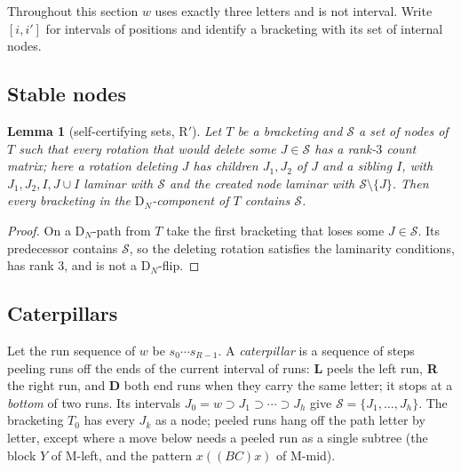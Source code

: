 \documentclass[11pt,a4paper]{article}
\newtheorem{lemma}[thm]{Lemma}
\theoremstyle{definition}
\theoremstyle{remark}
\newcommand{\DN}{\mathrm{D}_N}
\newcommand{\cS}{\mathcal{S}}
\begin{document}
Throughout this section $w$ uses exactly three letters and is not interval. Write $[i,i']$ for
intervals of positions and identify a bracketing with its set of internal nodes.

\subsection{Stable nodes}

\begin{lemma}[self-certifying sets, R$'$]\label{lem:Rprime}
Let $T$ be a bracketing and $\cS$ a set of nodes of $T$ such that every rotation that would delete some
$J\in\cS$ has a rank-$3$ count matrix; here a rotation deleting $J$ has children $J_1,J_2$ of $J$ and a
sibling $I$, with $J_1,J_2,I,J\cup I$ laminar with $\cS$ and the created node laminar with
$\cS\setminus\{J\}$. Then every bracketing in the $\DN$-component of $T$ contains $\cS$.
\end{lemma}
\begin{proof}
On a $\DN$-path from $T$ take the first bracketing that loses some $J\in\cS$. Its predecessor contains
$\cS$, so the deleting rotation satisfies the laminarity conditions, has rank $3$, and is not a
$\DN$-flip.
\end{proof}

\subsection{Caterpillars}

Let the run sequence of $w$ be $s_0\cdots s_{R-1}$. A \emph{caterpillar} is a sequence of steps peeling
runs off the ends of the current interval of runs: \textbf{L} peels the left run, \textbf{R} the right
run, and \textbf{D} both end runs when they carry the same letter; it stops at a \emph{bottom} of two
runs. Its intervals $J_0=w\supset J_1\supset\cdots\supset J_h$ give $\cS=\{J_1,\dots,J_h\}$. The
bracketing $T_0$ has every $J_k$ as a node; peeled runs hang off the path letter by letter, except where
a move below needs a peeled run as a single subtree (the block $Y$ of M-left, and the pattern $x((BC)x)$
of M-mid).
\end{document}
